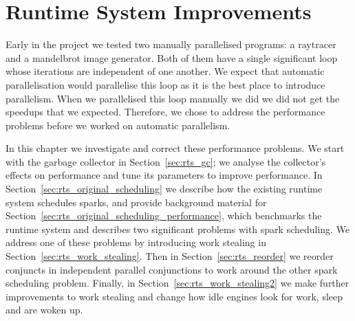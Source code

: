 
\chapter{Runtime System Improvements}
\label{chap:rts}


Early in the project
we tested two manually parallelised programs:
a raytracer and a mandelbrot image generator.
Both of them have a single significant loop
whose iterations are independent of one another.
We expect that automatic parallelisation would parallelise this loop
as it is the best place to introduce parallelism.
When we parallelised this loop manually we did
we did not get the speedups that we expected.
Therefore,
we chose to address the performance problems
before we worked on automatic parallelism.

In this chapter we investigate and correct these performance problems.
We start with the garbage collector in Section~\ref{sec:rts_gc};
we analyse the collector's effects on performance and tune its parameters
to improve performance.
In Section~\ref{sec:rts_original_scheduling} we describe how the existing runtime
system schedules sparks,
and provide background material for
Section~\ref{sec:rts_original_scheduling_performance},
which benchmarks the runtime system and describes two significant problems with
spark scheduling.
We address one of these problems by introducing work stealing in
Section~\ref{sec:rts_work_stealing}.
Then in Section~\ref{sec:rts_reorder} we reorder conjuncts in independent
parallel conjunctions to work around the other spark scheduling problem.
Finally, in Section~\ref{sec:rts_work_stealing2} we make further improvements to
work stealing and change how idle engines look for work, sleep and are
woken up.






%


%

